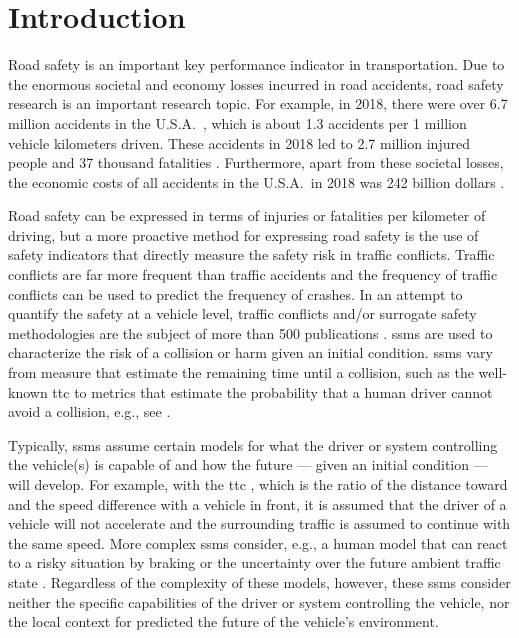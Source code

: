 \section{Introduction}
\label{sec:introduction}

Road safety is an important key performance indicator in transportation. 
Due to the enormous societal and economy losses incurred in road accidents, road safety research is an important research topic.
For example, in 2018, there were over 6.7 million accidents in the U.S.A.\ \autocite{nhtsa2020summary}, which is about 1.3 accidents per 1 million vehicle kilometers driven.
These accidents in 2018 led to 2.7 million injured people and 37 thousand fatalities \autocite{nhtsa2020summary}.
Furthermore, apart from these societal losses, the economic costs of all accidents in the U.S.A.\ in 2018 was 242 billion dollars \autocite{nhtsa2020summary}.

Road safety can be expressed in terms of injuries or fatalities per kilometer of driving, but a more proactive method for expressing road safety is the use of safety indicators that directly measure the safety risk in traffic conflicts.
Traffic conflicts are far more frequent than traffic accidents and the frequency of traffic conflicts can be used to predict the frequency of crashes.
In an attempt to quantify the safety at a vehicle level, traffic conflicts and/or surrogate safety methodologies are the subject of more than 500 publications \autocite{arun2021systematic}.
\acp{ssm} are used to characterize the risk of a collision or harm given an initial condition. 
\acp{ssm} vary from measure that estimate the remaining time until a collision, such as the well-known \ac{ttc} \autocite{hayward1972near} to metrics that estimate the probability that a human driver cannot avoid a collision, e.g., see \autocite{wang2014evaluation}.

Typically, \acp{ssm} assume certain models for what the driver or system controlling the vehicle(s) is capable of and how the future --- given an initial condition --- will develop. 
For example, with the \ac{ttc} \autocite{hayward1972near}, which is the ratio of the distance toward and the speed difference with a vehicle in front, it is assumed that the driver of a vehicle will not accelerate and the surrounding traffic is assumed to continue with the same speed. 
More complex \acp{ssm} consider, e.g., a human model that can react to a risky situation by braking \autocite{wang2014evaluation} or the uncertainty over the future ambient traffic state \autocite{mullakkal2020probabilistic}.
Regardless of the complexity of these models, however, these \acp{ssm} consider neither the specific capabilities of the driver or system controlling the vehicle, nor the local context for predicted the future of the vehicle's environment.


